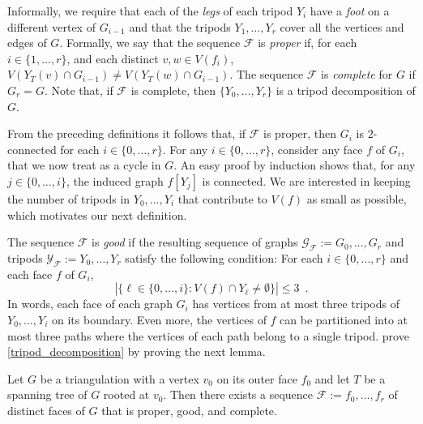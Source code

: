 \documentclass{patmorin}
\begin{document}
Informally, we require that each of the \emph{legs} of each tripod $Y_i$ have  a \emph{foot} on a different vertex of $G_{i-1}$ and that the tripods $Y_1,\ldots,Y_r$ cover all the vertices and edges of $G$. Formally, we say that the sequence $\mathcal{F}$ is \emph{proper} if, for each $i\in\{1,\ldots,r\}$, and each distinct $v,w\in V(f_i)$, $V(Y_T(v)\cap G_{i-1})\neq V(Y_T(w)\cap G_{i-1})$.  The sequence $\mathcal{F}$ is \emph{complete} for $G$ if $G_r=G$.  Note that, if $\mathcal{F}$ is complete, then $\{Y_0,\ldots,Y_r\}$ is a tripod decomposition of $G$.

From the preceding definitions it follows that, if $\mathcal{F}$ is proper, then  $G_i$ is $2$-connected for each $i\in\{0,\ldots,r\}$.  For any $i\in\{0,\ldots,r\}$, consider any face $f$ of $G_i$, that we now treat as a cycle in $G$. An easy proof by induction shows that, for any $j\in\{0,\ldots,i\}$, the induced graph $f[Y_j]$ is connected. %
We are interested in keeping the number of tripods in $Y_0,\ldots,Y_i$ that contribute to $V(f)$ as small as possible, which motivates our next definition.

The sequence $\mathcal{F}$ is \emph{good} if the resulting sequence of graphs $\mathcal{G}_\mathcal{F}:=G_0,\ldots,G_r$ and tripods $\mathcal{Y}_\mathcal{F}:=Y_0,\ldots,Y_r$ satisfy the following condition:  For each $i\in\{0,\ldots, r\}$ and each face $f$ of $G_i$,
\[
   |\{\ell\in\{0,\ldots,i\}: V(f)\cap Y_{\ell}\neq\emptyset\}|\le 3 \enspace .
\]
In words, each face of each graph $G_i$ has vertices from at most three tripods of $Y_0,\ldots,Y_i$ on its boundary.  Even more, the vertices of $f$ can be partitioned into at most three paths where the vertices of each path belong to a single tripod. \citet{dujmovic.joret.ea:planar} prove \cref{tripod_decomposition} by proving the next lemma.


\begin{lem}\label{face_trick}
  Let $G$ be a triangulation with a vertex $v_0$ on its outer face $f_0$ and let $T$ be a spanning tree of $G$ rooted at $v_0$.  Then there exists a sequence $\mathcal{F}:=f_0,\ldots,f_{r}$ of distinct faces of $G$ that is proper, good, and complete.
\end{lem}
\end{document}
